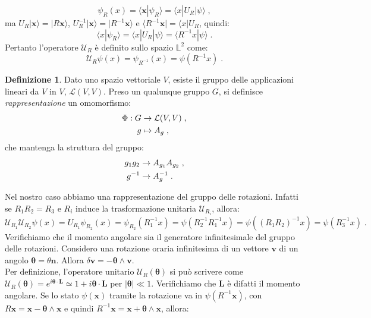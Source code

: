 \documentclass[10pt,a4paper]{report}
\theoremstyle{definition}
\newtheorem{dfn}{Definizione}[section]
\newcommand{\lag}{\mathcal{L}}
\numberwithin{equation}{section}
\newcommand{\bra}{\langle}
\newcommand{\ket}{\rangle}
\begin{document}
\begin{equation}
\psi_R(x)=\bra \mathbf{x}|\psi_R\ket=\bra x|U_R|\psi\ket\;,
\end{equation}
ma $U_R|\mathbf{x}\ket=|R\mathbf{x}\ket$, $U_R^{-1}|\mathbf{x}\ket=|R^{-1}\mathbf{x}\ket$ e $\bra R^{-1}\mathbf{x}|=\bra x|U_R$, quindi:
\begin{equation}
\bra x|\psi_R\ket=\bra x|U_R|\psi\ket=\bra R^{-1}x|\psi\ket\;.
\end{equation}
Pertanto l'operatore $\mathcal{U}_R$ è definito sullo spazio $\mathbb{L}^2$ come:
\begin{equation}
\mathcal{U}_R\psi(x)=\psi_{R^{-1}}(x)=\psi(R^{-1}x)\;.
\end{equation}
\begin{dfn} Dato uno spazio vettoriale $V$, esiste il gruppo delle applicazioni lineari da $V$ in $V$, $\lag(V,V)$. Preso un qualunque gruppo $G$, si definisce \textit{rappresentazione} un omomorfismo:
\begin{align}
\Phi:G&\to\lag(V,V) \notag\;, \\
g &\mapsto A_g\;,
\end{align}
che mantenga la struttura del gruppo:
\begin{align}
g_1g_2 &\to A_{g_1}A_{g_2}\;, \notag \\
g^{-1} &\to A_g^{-1}\;.
\end{align}
\end{dfn}
Nel nostro caso abbiamo una rappresentazione del gruppo delle rotazioni. Infatti se $R_1R_2=R_3$ e $R_i$ induce la trasformazione unitaria $\mathcal{U}_{R_i}$, allora:
\begin{equation}
\mathcal{U}_{R_1}\mathcal{U}_{R_2}\psi(x)=U_{R_1}\psi_{R_2}(x)=\psi_{R_2}(R_1^{-1}x)=\psi(R_2^{-1}R_1^{-1}x)=\psi((R_1R_2)^{-1}x)=\psi(R_3^{-1}x)\;.
\end{equation}
Verifichiamo che il momento angolare sia il generatore infinitesimale del gruppo delle rotazioni. Considero una rotazione oraria infinitesima di un vettore $\mathbf{v}$ di un angolo $\boldsymbol{\theta}=\theta\hat{\mathbf{n}}$. Allora
$\delta\mathbf{v}=-\boldsymbol{\theta}\wedge\mathbf{v}$. \\
Per definizione, l'operatore unitario $\mathcal{U}_R(\boldsymbol{\theta})$ si può scrivere come $\mathcal{U}_R(\boldsymbol{\theta})=e^{i\boldsymbol{\theta}\cdot\mathbf{L}}\simeq 1+i\boldsymbol{\theta}\cdot\mathbf{L}$ per $|\boldsymbol{\theta}|\ll 1$. Verifichiamo che $\mathbf{L}$ è difatti il momento angolare. Se lo stato $\psi(\mathbf{x})$ tramite la rotazione va in $\psi(R^{-1}\mathbf{x})$, con $R\mathbf{x}=\mathbf{x}-\boldsymbol{\theta}\wedge \mathbf{x}$ e quindi $R^{-1}\mathbf{x}=\mathbf{x}+\boldsymbol{\theta}\wedge\mathbf{x}$, allora:
\end{document}
